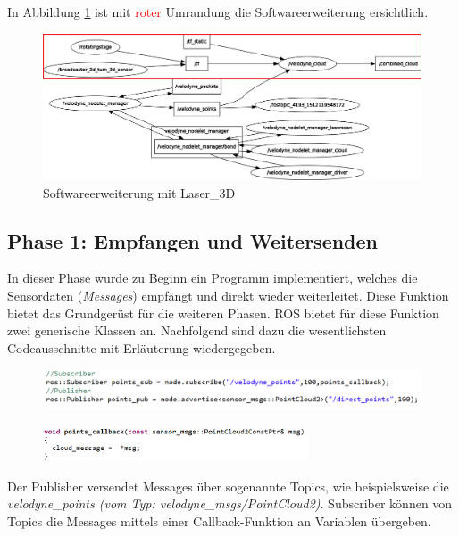 In Abbildung \ref{fig:rqt_graph_erweitert_2} ist mit \textcolor{red}{roter} Umrandung die Softwareerweiterung ersichtlich. 

\begin{figure}[H]
	\centering
	\includegraphics[width=1.0\textwidth]{resources/rqt_graph_erweitert_2.png}
	\caption[Softwareerweiterung mit Laser\_3D]{Softwareerweiterung mit Laser\_3D}
	\label{fig:rqt_graph_erweitert_2}
\end{figure} 
\subsection{Phase 1: Empfangen und Weitersenden}
\label{subsec:Phase2}
In dieser Phase wurde zu Beginn ein Programm implementiert, welches die Sensordaten (\textit{Messages}) empfängt und direkt wieder weiterleitet. Diese Funktion bietet das Grundgerüst für die weiteren Phasen. ROS bietet für diese Funktion zwei generische Klassen an.  Nachfolgend sind dazu die wesentlichsten Codeausschnitte mit Erläuterung wiedergegeben. \cite{pubsub}

\begin{figure}[H]

	\includegraphics[width=1.0\textwidth]{resources/sourcecode/pubsub.png} \\
	\\
	\includegraphics[width=0.7\textwidth]{resources/sourcecode/callback.png} 
	\label{fig:pubsub}
\end{figure} 

Der Publisher versendet Messages über sogenannte Topics, wie beispielsweise die \textit{velodyne\_points (vom Typ: velodyne\_msgs/PointCloud2)}. Subscriber können von Topics die Messages mittels einer Callback-Funktion an Variablen übergeben.

